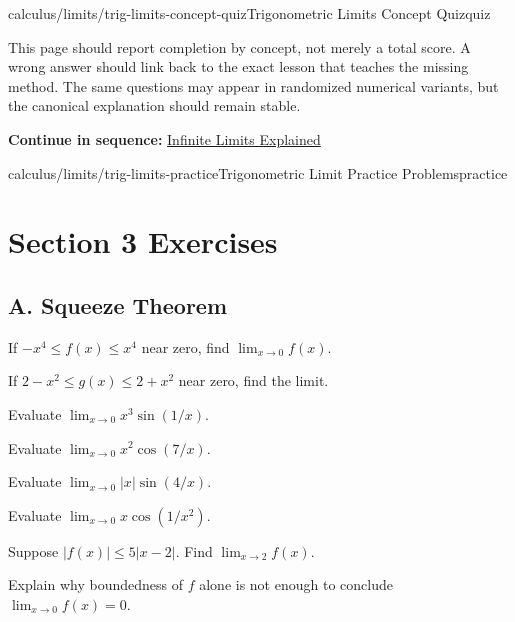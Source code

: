 \documentclass[11pt,openany]{book}
\theoremstyle{bgplain}
\newcommand{\webnext}[2]{%
  \par\addvspace{1.2em}\noindent{\color{BGLine}\rule{\textwidth}{0.35pt}}\par\smallskip
  {\small\color{BGGray}\textbf{Continue in sequence:} \hyperlink{web:#1}{#2}}\par
}
\begin{document}
\begin{webpage}{calculus/limits/trig-limits-concept-quiz}{Trigonometric Limits Concept Quiz}{quiz}
\begin{bgsummary}[title={Quiz use on the website}]
This page should report completion by concept, not merely a total score. A wrong answer should link back to the exact lesson that teaches the missing method. The same questions may appear in randomized numerical variants, but the canonical explanation should remain stable.
\end{bgsummary}
\webnext{calculus/limits/infinite-limits}{Infinite Limits Explained}
\end{webpage}

\begin{webpage}{calculus/limits/trig-limits-practice}{Trigonometric Limit Practice Problems}{practice}
\section*{Section 3 Exercises}

\subsection*{A. Squeeze Theorem}
\begin{bgexercises}[label=\textbf{3.\arabic*}]
  \item If \(-x^4\le f(x)\le x^4\) near zero, find \(\lim_{x\to0}f(x)\).
  \item If \(2-x^2\le g(x)\le2+x^2\) near zero, find the limit.
  \item Evaluate \(\lim_{x\to0}x^3\sin(1/x)\).
  \item Evaluate \(\lim_{x\to0}x^2\cos(7/x)\).
  \item Evaluate \(\lim_{x\to0}|x|\sin(4/x)\).
  \item Evaluate \(\lim_{x\to0}x\cos(1/x^2)\).
  \item Suppose \(|f(x)|\le5|x-2|\). Find \(\lim_{x\to2}f(x)\).
  \item Explain why boundedness of \(f\) alone is not enough to conclude \(\lim_{x\to0}f(x)=0\).
\end{bgexercises}


\end{webpage}
\end{document}
